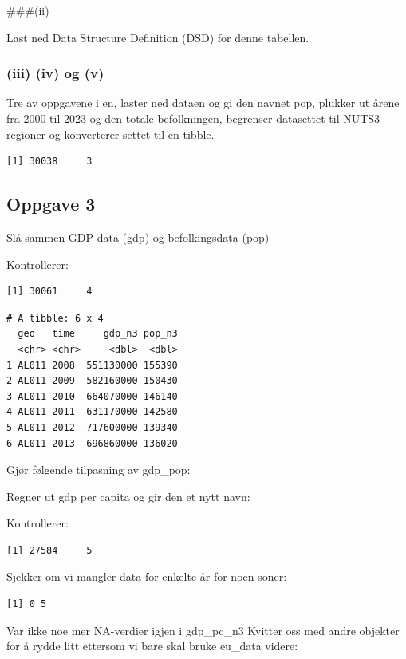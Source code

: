 \documentclass[
  a4paper,
]{article}
\begin{document}
\#\#\#(ii)

Last ned Data Structure Definition (DSD) for denne tabellen.

\subsubsection{(iii) (iv) og (v)}\label{iii-iv-og-v}

Tre av oppgavene i en, laster ned dataen og gi den navnet pop, plukker
ut årene fra 2000 til 2023 og den totale befolkningen, begrenser
datasettet til NUTS3 regioner og konverterer settet til en tibble.

\begin{verbatim}
[1] 30038     3
\end{verbatim}

\subsection{Oppgave 3}\label{oppgave-3}

Slå sammen GDP-data (gdp) og befolkingsdata (pop)

Kontrollerer:

\begin{verbatim}
[1] 30061     4
\end{verbatim}

\begin{verbatim}
# A tibble: 6 x 4
  geo   time     gdp_n3 pop_n3
  <chr> <chr>     <dbl>  <dbl>
1 AL011 2008  551130000 155390
2 AL011 2009  582160000 150430
3 AL011 2010  664070000 146140
4 AL011 2011  631170000 142580
5 AL011 2012  717600000 139340
6 AL011 2013  696860000 136020
\end{verbatim}

Gjør følgende tilpasning av gdp\_pop:

Regner ut gdp per capita og gir den et nytt navn:

Kontrollerer:

\begin{verbatim}
[1] 27584     5
\end{verbatim}

Sjekker om vi mangler data for enkelte år for noen soner:

\begin{verbatim}
[1] 0 5
\end{verbatim}

Var ikke noe mer NA-verdier igjen i gdp\_pc\_n3 Kvitter oss med andre
objekter for å rydde litt ettersom vi bare skal bruke eu\_data videre:
\end{document}

